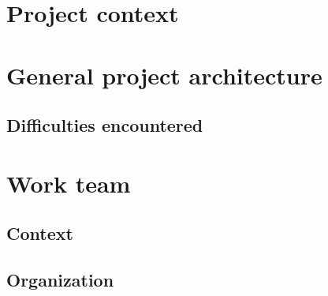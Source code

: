 \section{Project context}

\section{General project architecture}
\subsection{Difficulties encountered}

\section{Work team}
\subsection{Context}
\subsection{Organization}

\clearpage
